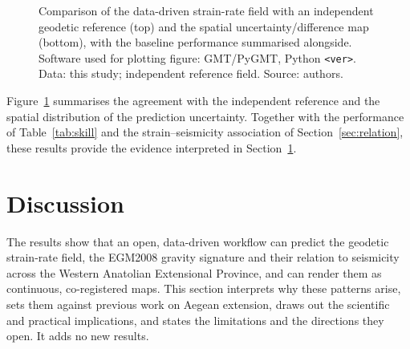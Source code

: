 \documentclass[pdflatex,sn-mathphys-num]{sn-jnl}%
\theoremstyle{thmstyleone}%
\theoremstyle{thmstyletwo}%
\theoremstyle{thmstylethree}%
\begin{document}
\begin{figure}[htbp]\centering
  \caption{Comparison of the data-driven strain-rate field with an independent geodetic
  reference (top) and the spatial uncertainty/difference map (bottom), with the baseline
  performance summarised alongside. Software used for plotting figure: GMT/PyGMT, Python
  \texttt{<ver>}. Data: this study; independent reference field. Source: authors.}\label{fig:comparison}
\end{figure}

Figure~\ref{fig:comparison} summarises the agreement with the independent reference and
the spatial distribution of the prediction uncertainty. Together with the performance
of Table~\ref{tab:skill} and the strain--seismicity association of
Section~\ref{sec:relation}, these results provide the evidence interpreted in
Section~\ref{sec:discussion}.

\section{Discussion}\label{sec:discussion}
The results show that an open, data-driven workflow can predict the geodetic
strain-rate field, the EGM2008 gravity signature and their relation to seismicity
across the Western Anatolian Extensional Province, and can render them as continuous,
co-registered maps. This section interprets why these patterns arise, sets them
against previous work on Aegean extension, draws out the scientific and practical
implications, and states the limitations and the directions they open. It adds no new
results.
\end{document}
